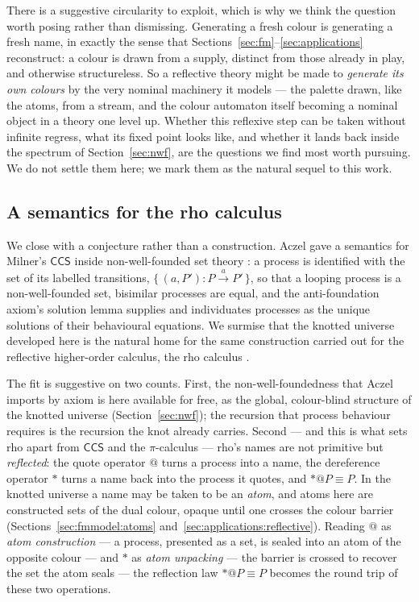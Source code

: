 There is a suggestive circularity to exploit, which is why we think the question
worth posing rather than dismissing. Generating a fresh colour is generating a
fresh name, in exactly the sense that
Sections~\ref{sec:fm}--\ref{sec:applications} reconstruct: a colour is drawn from
a supply, distinct from those already in play, and otherwise structureless. So a
reflective theory might be made to \emph{generate its own colours} by the very
nominal machinery it models --- the palette drawn, like the atoms, from a stream,
and the colour automaton itself becoming a nominal object in a theory one level
up. Whether this reflexive step can be taken without infinite regress, what its
fixed point looks like, and whether it lands back inside the spectrum of
Section~\ref{sec:nwf}, are the questions we find most worth pursuing. We do not
settle them here; we mark them as the natural sequel to this work.

\subsection{A semantics for the rho calculus}
\label{sec:future:rho}

We close with a conjecture rather than a construction. Aczel gave a semantics for
Milner's $\mathsf{CCS}$ inside non-well-founded set theory \cite{aczel1988nwf}: a
process is identified with the set of its labelled transitions,
$\{\,(a,P') : P \xrightarrow{a} P'\,\}$, so that a looping process is a
non-well-founded set, bisimilar processes are equal, and the anti-foundation
axiom's solution lemma supplies and individuates processes as the unique
solutions of their behavioural equations. We surmise that the knotted universe
developed here is the natural home for the same construction carried out for the
reflective higher-order calculus, the rho calculus
\cite{DBLP:journals/entcs/MeredithR05}.

The fit is suggestive on two counts. First, the non-well-foundedness that Aczel
imports by axiom is here available for free, as the global, colour-blind structure
of the knotted universe (Section~\ref{sec:nwf}); the recursion that process
behaviour requires is the recursion the knot already carries. Second --- and this
is what sets rho apart from $\mathsf{CCS}$ and the $\pi$-calculus --- rho's names
are not primitive but \emph{reflected}: the quote operator $@$ turns a process
into a name, the dereference operator $*$ turns a name back into the process it
quotes, and $*@P \equiv P$. In the knotted universe a name may be taken to be an
\emph{atom}, and atoms here are constructed sets of the dual colour, opaque until
one crosses the colour barrier (Sections~\ref{sec:fmmodel:atoms}
and~\ref{sec:applications:reflective}). Reading $@$ as \emph{atom construction}
--- a process, presented as a set, is sealed into an atom of the opposite colour
--- and $*$ as \emph{atom unpacking} --- the barrier is crossed to recover the set
the atom seals --- the reflection law $*@P \equiv P$ becomes the round trip of
these two operations.

